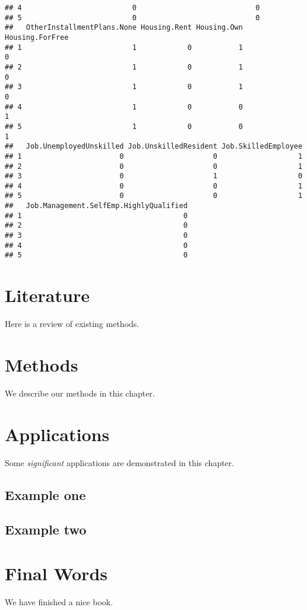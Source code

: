 \documentclass[
]{book}
\begin{document}
\begin{verbatim}
## 4                          0                            0
## 5                          0                            0
##   OtherInstallmentPlans.None Housing.Rent Housing.Own Housing.ForFree
## 1                          1            0           1               0
## 2                          1            0           1               0
## 3                          1            0           1               0
## 4                          1            0           0               1
## 5                          1            0           0               1
##   Job.UnemployedUnskilled Job.UnskilledResident Job.SkilledEmployee
## 1                       0                     0                   1
## 2                       0                     0                   1
## 3                       0                     1                   0
## 4                       0                     0                   1
## 5                       0                     0                   1
##   Job.Management.SelfEmp.HighlyQualified
## 1                                      0
## 2                                      0
## 3                                      0
## 4                                      0
## 5                                      0
\end{verbatim}

\hypertarget{literature}{%
\chapter{Literature}\label{literature}}

Here is a review of existing methods.

\hypertarget{methods}{%
\chapter{Methods}\label{methods}}

We describe our methods in this chapter.

\hypertarget{applications}{%
\chapter{Applications}\label{applications}}

Some \emph{significant} applications are demonstrated in this chapter.

\hypertarget{example-one}{%
\section{Example one}\label{example-one}}

\hypertarget{example-two}{%
\section{Example two}\label{example-two}}

\hypertarget{final-words}{%
\chapter{Final Words}\label{final-words}}

We have finished a nice book.

  
\end{document}

